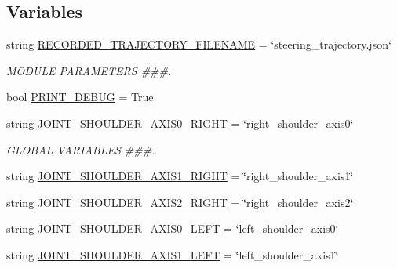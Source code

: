 \subsection*{Variables}
\begin{DoxyCompactItemize}
\item 
string \mbox{\hyperlink{namespacesteering__interpolate__and__print_a43ff4edddfa844fcd5bfbcc0fb56991e}{R\+E\+C\+O\+R\+D\+E\+D\+\_\+\+T\+R\+A\+J\+E\+C\+T\+O\+R\+Y\+\_\+\+F\+I\+L\+E\+N\+A\+ME}} = \char`\"{}steering\+\_\+trajectory.\+json\char`\"{}
\begin{DoxyCompactList}\small\item\em M\+O\+D\+U\+LE P\+A\+R\+A\+M\+E\+T\+E\+RS \#\#\#. \end{DoxyCompactList}\item 
bool \mbox{\hyperlink{namespacesteering__interpolate__and__print_ad733852aef93a53d8891a88c7e90a09d}{P\+R\+I\+N\+T\+\_\+\+D\+E\+B\+UG}} = True
\item 
string \mbox{\hyperlink{namespacesteering__interpolate__and__print_af78fbb58fb90a5b417dada8fa0b5b8f2}{J\+O\+I\+N\+T\+\_\+\+S\+H\+O\+U\+L\+D\+E\+R\+\_\+\+A\+X\+I\+S0\+\_\+\+R\+I\+G\+HT}} = \char`\"{}right\+\_\+shoulder\+\_\+axis0\char`\"{}
\begin{DoxyCompactList}\small\item\em G\+L\+O\+B\+AL V\+A\+R\+I\+A\+B\+L\+ES \#\#\#. \end{DoxyCompactList}\item 
string \mbox{\hyperlink{namespacesteering__interpolate__and__print_a1648eb1f54cff9187cb863cec45143cb}{J\+O\+I\+N\+T\+\_\+\+S\+H\+O\+U\+L\+D\+E\+R\+\_\+\+A\+X\+I\+S1\+\_\+\+R\+I\+G\+HT}} = \char`\"{}right\+\_\+shoulder\+\_\+axis1\char`\"{}
\item 
string \mbox{\hyperlink{namespacesteering__interpolate__and__print_a6face1459c03cb690ddb27c0a045e4e3}{J\+O\+I\+N\+T\+\_\+\+S\+H\+O\+U\+L\+D\+E\+R\+\_\+\+A\+X\+I\+S2\+\_\+\+R\+I\+G\+HT}} = \char`\"{}right\+\_\+shoulder\+\_\+axis2\char`\"{}
\item 
string \mbox{\hyperlink{namespacesteering__interpolate__and__print_a55ca412ef4acf51ba8961d6d3b97fb2d}{J\+O\+I\+N\+T\+\_\+\+S\+H\+O\+U\+L\+D\+E\+R\+\_\+\+A\+X\+I\+S0\+\_\+\+L\+E\+FT}} = \char`\"{}left\+\_\+shoulder\+\_\+axis0\char`\"{}
\item 
string \mbox{\hyperlink{namespacesteering__interpolate__and__print_a14cc312176af5ef29331ae74be7de596}{J\+O\+I\+N\+T\+\_\+\+S\+H\+O\+U\+L\+D\+E\+R\+\_\+\+A\+X\+I\+S1\+\_\+\+L\+E\+FT}} = \char`\"{}left\+\_\+shoulder\+\_\+axis1\char`\"{}

\end{DoxyCompactItemize}
